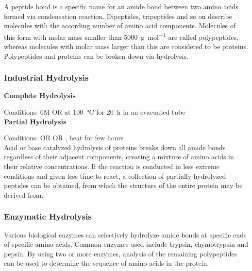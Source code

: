 \documentclass[../main]{subfiles}
\begin{document}
	A peptide bond is a specific name for an amide bond between two amino acids formed via condensation reaction. Dipeptides, tripeptides and so on describe molecules with the according number of amino acid components. Molecules of this form with molar mass smaller than \SI{5000}{\gram\per\mol} are called polypeptides, whereas molecules with molar mass larger than this are considered to be proteins. \\

	Polypeptides and proteins can be broken down via hydrolysis. \\

	\subsubsection{Industrial Hydrolysis}

	\noindent \textbf{Complete Hydrolysis}

	Conditions: 6M  OR  at \SI{100}{\celsius} for \SI{20}{\hour} in an evacuated tube \\

	\noindent \textbf{Partial Hydrolysis}

	Conditions:  OR  OR , heat for few hours \\

	Acid or base catalyzed hydrolysis of proteins breaks down all amide bonds regardless of their adjacent components, creating a mixture of amino acids in their relative concentrations. If the reaction is conducted in less extreme conditions and given less time to react, a collection of partially hydrolyzed peptides can be obtained, from which the structure of the entire protein may be derived from. \\

	\subsubsection{Enzymatic Hydrolysis}

	Various biological enzymes can selectively hydrolyze amide bonds at specific ends of specific amino acids. Common enzymes used include trypsin, chymotrypsin and pepsin. By using two or more enzymes, analysis of the remaining polypeptides can be used to determine the sequence of amino acids in the protein.
\end{document}
